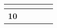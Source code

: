 \documentclass[12pt,a4paper,twoside]{article}
\begin{document}
\begin{longtable}{|>{\centering\arraybackslash}m{10cm}|>{\centering\arraybackslash}m{1.5cm}|>{\centering\arraybackslash}m{1.5cm}|>{\centering\arraybackslash}m{1.5cm}|>{\centering\arraybackslash}m{1.5cm}|}
                        
                            

                            
                                 & \textbf{}
                            

                        
                    
                        
                            

                            
                                 & \textbf{}
                            

                        
                    
                        
                            

                            
                                 & \textbf{}
                            

                        
                    
                    \\ \hline
                
                    \cellcolor{gray!20} \textbf{ 10 }
                     
                        
                            

                            
                                 & \textbf{}
                            

                        
                    
                        
                            

                            
                                 & \textbf{}
                            

                        
                    
                        
                            & \cellcolor{gray!20} \textbf{}
                        
                    
                        
                            & \cellcolor{gray!20} \textbf{}
                        
                    
                    \\ \hline
                
    
            \end{longtable}
\end{document}
